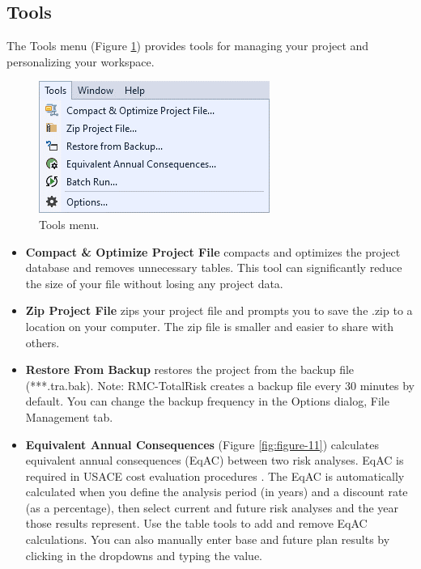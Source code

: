 \documentclass[
]{book}
\begin{document}
\hypertarget{gui-menu-bar-tools}{%
\subsection{Tools}\label{gui-menu-bar-tools}}

The Tools menu (Figure \ref{fig:figure-10}) provides tools for managing your project and personalizing your workspace.

\begin{figure}

{\centering \includegraphics{images/figure10} 

}

\caption{Tools menu.}\label{fig:figure-10}
\end{figure}

\begin{itemize}
\item
  \textbf{Compact \& Optimize Project File} compacts and optimizes the project database and removes unnecessary tables. This tool can significantly reduce the size of your file without losing any project data.
\item
  \textbf{Zip Project File} zips your project file and prompts you to save the .zip to a location on your computer. The zip file is smaller and easier to share with others.
\item
  \textbf{Restore From Backup} restores the project from the backup file (***.tra.bak). Note: RMC-TotalRisk creates a backup file every 30 minutes by default. You can change the backup frequency in the Options dialog, File Management tab.
\item
  \textbf{Equivalent Annual Consequences} (Figure \ref{fig:figure-11}) calculates equivalent annual consequences (EqAC) between two risk analyses. EqAC is required in USACE cost evaluation procedures \citep{cite-TechRef}. The EqAC is automatically calculated when you define the analysis period (in years) and a discount rate (as a percentage), then select current and future risk analyses and the year those results represent. Use the table tools to add and remove EqAC calculations. You can also manually enter base and future plan results by clicking in the dropdowns and typing the value.
\end{itemize}
\end{document}

